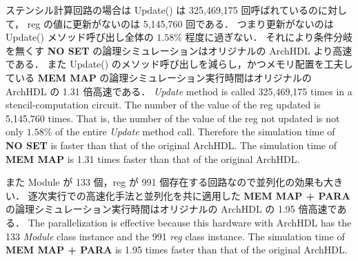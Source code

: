 ステンシル計算回路の場合は Update() は 325,469,175 回呼ばれているのに対して，
reg の値に更新がないのは 5,145,760 回である．
つまり更新がないのは Update() メソッド呼び出し全体の $1.58\%$ 程度に過ぎない．
それにより条件分岐を無くす \textbf{NO SET} の論理シミュレーションはオリジナルの ArchHDL より高速である．
また Update() のメソッド呼び出しを減らし，かつメモリ配置を工夫している \textbf{MEM MAP} の論理シミュレーション実行時間はオリジナルの ArchHDL の 1.31 倍高速である．
\fi
\textit{Update} method is called 325,469,175 times in a stencil-computation circuit.
The number of the value of the reg updated is 5,145,760 times.
That is, the number of the value of the reg not updated is not only $1.58\%$ of the entire \textit{Update} method call.
Therefore the simulation time of \textbf{NO SET} is faster than that of the original ArchHDL.
The simulation time of \textbf{MEM MAP} is 1.31 times faster than that of the original ArchHDL.

また Module が 133 個，reg が 991 個存在する回路なので並列化の効果も大きい．
逐次実行での高速化手法と並列化を共に適用した \textbf{MEM MAP + PARA} の論理シミュレーション実行時間はオリジナルの ArchHDL の 1.95 倍高速である．
\fi
The parallelization is effective because this hardware with ArchHDL has the 133 \textit{Module} class instance and the 991 \textit{reg} class instance.
The simulation time of \textbf{MEM MAP + PARA} is 1.95 times faster than that of the original ArchHDL.


